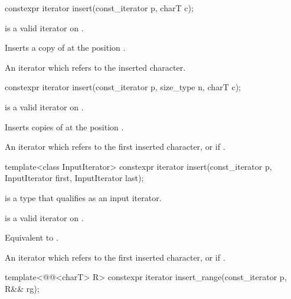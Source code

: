 %
\begin{itemdecl}
constexpr iterator insert(const_iterator p, charT c);
\end{itemdecl}

\begin{itemdescr}
\pnum
\expects
{} is a valid iterator on
.

\pnum
\effects
Inserts a copy of  at the position .

\pnum
\returns
An iterator which refers to the inserted character.
\end{itemdescr}

%
\begin{itemdecl}
constexpr iterator insert(const_iterator p, size_type n, charT c);
\end{itemdecl}

\begin{itemdescr}
\pnum
\expects
{} is a valid iterator on
.

\pnum
\effects
Inserts  copies of  at the position .

\pnum
\returns
An iterator which refers to  the first inserted character, or
 if .
\end{itemdescr}

%
\begin{itemdecl}
template<class InputIterator>
  constexpr iterator insert(const_iterator p, InputIterator first, InputIterator last);
\end{itemdecl}

\begin{itemdescr}
\pnum
\constraints
{} is a type that qualifies as an input
iterator.

\pnum
\expects
{} is a valid iterator on
.

\pnum
\effects
Equivalent to
.

\pnum
\returns
An iterator which refers to the first inserted character, or
 if .
\end{itemdescr}

%
\begin{itemdecl}
template<@@<charT> R>
  constexpr iterator insert_range(const_iterator p, R&& rg);
\end{itemdecl}

